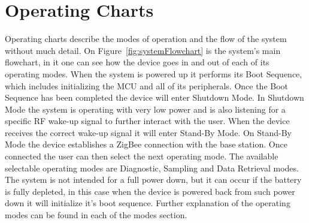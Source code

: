 \section{Operating Charts}
Operating charts describe the modes of operation and the flow of the system without much detail. On Figure~\ref{fig:systemFlowchart} is the system's main flowchart, in it one can see how the device goes in and out of each of its operating modes. When the system is powered up it performs its Boot Sequence, which includes initializing the MCU and all of its peripherals. Once the Boot Sequence has been completed the device will enter Shutdown Mode. In Shutdown Mode the system is operating with very low power and is also listening for a specific RF wake-up signal to further interact with the user. When the device receives the correct wake-up signal it will enter Stand-By Mode. On Stand-By Mode the device establishes a ZigBee connection with the base station. Once connected the user can then select the next operating mode. The available selectable operating modes are Diagnostic, Sampling and Data Retrieval modes. The system is not intended for a full power down, but it can occur if the battery is fully depleted, in this case when the device is powered back from such power down it will initialize it's boot sequence. Further explanation of the operating modes can be found in each of the modes section.
